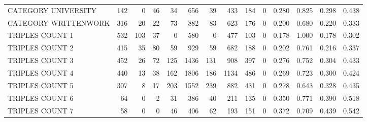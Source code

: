 \begin{tabular}{lrrrrrrrrrllll}
 CATEGORY UNIVERSITY      &             142 &             0 &              46 &              34 &             656 &   39 &  433 &  184 &    0 & 0.280 & 0.825 & 0.298 & 0.438 \\
 CATEGORY WRITTENWORK     &             316 &            20 &              22 &              73 &             882 &   83 &  623 &  176 &    0 & 0.200 & 0.680 & 0.220 & 0.333 \\
 TRIPLES COUNT 1          &             532 &           103 &              37 &               0 &             580 &    0 &  477 &  103 &    0 & 0.178 & 1.000 & 0.178 & 0.302 \\
 TRIPLES COUNT 2          &             415 &            35 &              80 &              59 &             929 &   59 &  682 &  188 &    0 & 0.202 & 0.761 & 0.216 & 0.337 \\
 TRIPLES COUNT 3          &             452 &            26 &              72 &             125 &            1436 &  131 &  908 &  397 &    0 & 0.276 & 0.752 & 0.304 & 0.433 \\
 TRIPLES COUNT 4          &             440 &            13 &              38 &             162 &            1806 &  186 & 1134 &  486 &    0 & 0.269 & 0.723 & 0.300 & 0.424 \\
 TRIPLES COUNT 5          &             307 &             8 &              17 &             203 &            1552 &  239 &  882 &  431 &    0 & 0.278 & 0.643 & 0.328 & 0.435 \\
 TRIPLES COUNT 6          &              64 &             0 &               2 &              31 &             386 &   40 &  211 &  135 &    0 & 0.350 & 0.771 & 0.390 & 0.518 \\
 TRIPLES COUNT 7          &              58 &             0 &               0 &              46 &             406 &   62 &  193 &  151 &    0 & 0.372 & 0.709 & 0.439 & 0.542 \\
\hline
\end{tabular}